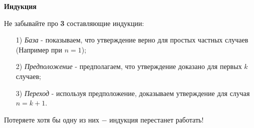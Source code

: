 \documentclass{article}
\begin{document}
    \large

    \begin{center}
        \textbf{Индукция}
    \end{center}

    Не забывайте про \textbf{3} составляющие индукции:
    \begin{enumerate}
        \item[1)] \textit{База} - показываем, что утверждение верно для простых частных случаев (Например при $n = 1$);

        \item[2)] \textit{Предположение} - предполагаем, что утверждение доказано для первых $k$ случаев;

        \item[3)] \textit{Переход} - используя предположение, доказываем утверждение для случая $n = k + 1$.

    \end{enumerate}

    Потеряете хотя бы одну из них $-$ индукция перестанет работать!
\end{document}
